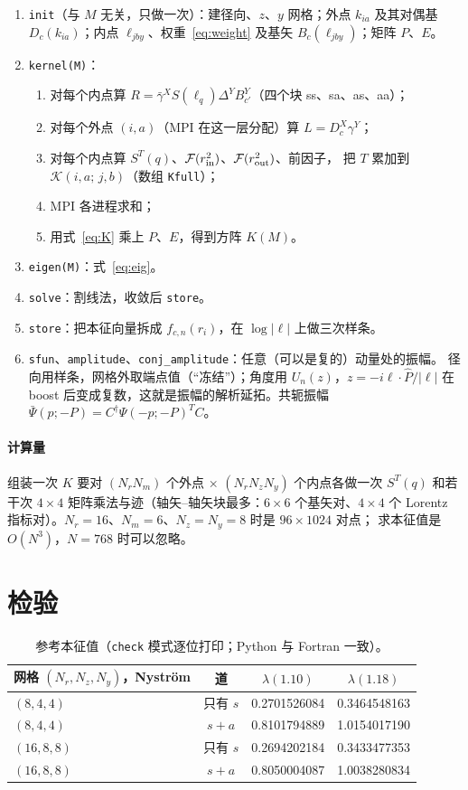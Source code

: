 \documentclass[11pt,a4paper]{ctexart}
\newcommand{\lQ}{\ell_q}
\newcommand{\code}[1]{\texttt{#1}}
\begin{document}
\begin{enumerate}
\item \code{init}（与 $M$ 无关，只做一次）：建径向、$z$、$y$ 网格；外点 $k_{ia}$ 及其对偶基
$D_c(k_{ia})$；内点 $\ell_{jby}$、权重~\eqref{eq:weight} 及基矢 $B_c(\ell_{jby})$；矩阵 $P$、$E$。
\item \code{kernel(M)}：
  \begin{enumerate}
  \item 对每个内点算 $R=\bar\gamma^XS(\lQ)\Delta^YB^Y_{c'}$（四个块 ss、sa、as、aa）；
  \item 对每个外点 $(i,a)$（MPI 在这一层分配）算 $L=D^X_c\gamma^Y$；
  \item 对每个内点算 $S^T(q)$、$\mathcal F(r_{\rm in}^2)$、$\mathcal F(r_{\rm out}^2)$、前因子，
  把 $T$ 累加到 $\mathcal K(i,a;\,j,b)$（数组 \code{Kfull}）；
  \item MPI 各进程求和；
  \item 用式~\eqref{eq:K} 乘上 $P$、$E$，得到方阵 $K(M)$。
  \end{enumerate}
\item \code{eigen(M)}：式~\eqref{eq:eig}。
\item \code{solve}：割线法，收敛后 \code{store}。
\item \code{store}：把本征向量拆成 $f_{c,n}(r_i)$，在 $\log|\ell|$ 上做三次样条。
\item \code{sfun}、\code{amplitude}、\code{conj\_amplitude}：任意（可以是复的）动量处的振幅。
径向用样条，网格外取端点值（“冻结”）；角度用 $U_n(z)$，$z=-i\ell\!\cdot\!\hat P/|\ell|$ 在 boost
后变成复数，这就是振幅的解析延拓。共轭振幅 $\bar\Psi(p;-P)=C^\dagger\Psi(-p;-P)^TC$。
\end{enumerate}

\paragraph{计算量} 组装一次 $K$ 要对 $(N_rN_m)$ 个外点 × $(N_rN_zN_y)$ 个内点各做一次
$S^T(q)$ 和若干次 $4\times4$ 矩阵乘法与迹（轴矢--轴矢块最多：$6\times6$ 个基矢对、$4\times4$ 个
Lorentz 指标对）。$N_r=16$、$N_m=6$、$N_z=N_y=8$ 时是 $96\times1024$ 对点；
求本征值是 $O(N^3)$，$N=768$ 时可以忽略。

\section{检验}

\begin{table}[H]
\centering\small
\begin{tabular}{lccc}
\toprule
网格 $(N_r,N_z,N_y)$，Nystr\"om & 道 & $\lambda(1.10)$ & $\lambda(1.18)$\\
\midrule
$(8,4,4)$ & 只有 $s$ & 0.2701526084 & 0.3464548163\\
$(8,4,4)$ & $s+a$ & 0.8101794889 & 1.0154017190\\
$(16,8,8)$ & 只有 $s$ & 0.2694202184 & 0.3433477353\\
$(16,8,8)$ & $s+a$ & 0.8050004087 & 1.0038280834\\
\bottomrule
\end{tabular}
\caption{参考本征值（\code{check} 模式逐位打印；Python 与 Fortran 一致）。}
\end{table}
\end{document}
